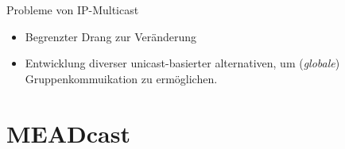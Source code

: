 \documentclass[compress,fleqn,utf8,aspectratio=169,t]{beamer}
\begin{document}
\begin{frame}{Probleme von IP-Multicast}
\begin{itemize}
		\item Begrenzter Drang zur Veränderung
		\item<2->[$\Rightarrow$]
            Entwicklung diverser unicast-basierter alternativen, um (\textit{globale}) Gruppenkommuikation zu ermöglichen.
	\end{itemize}
\end{frame}


\section{MEADcast} %
\label{sec:MEADcast}
\end{document}
